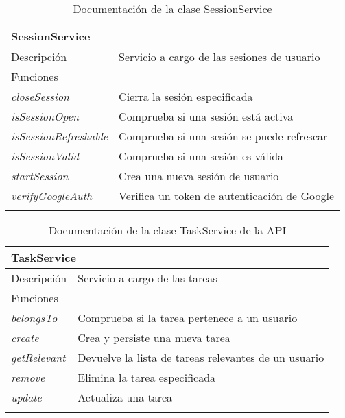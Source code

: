 \begin{longtable}{|p{} p{}|}
    \hline
    \multicolumn{2}{|l|}{\textbf{SessionService}} \\ \hline \hline
    Descripción      & Servicio a cargo de las sesiones de usuario \\ \hline
    \multicolumn{2}{|l|}{Funciones} \\
    \emph{closeSession}  & Cierra la sesión especificada  \\
    \emph{isSessionOpen}  & Comprueba si una sesión está activa  \\
    \emph{isSessionRefreshable}  & Comprueba si una sesión se puede refrescar  \\
    \emph{isSessionValid}  & Comprueba si una sesión es válida  \\
    \emph{startSession}  & Crea una nueva sesión de usuario  \\
    \emph{verifyGoogleAuth}  & Verifica un token de autenticación de Google  \\ \hline
    \caption{Documentación de la clase SessionService}
    \label{dis:api:session_service}
\end{longtable}

\vspace{-10pt}
\begin{longtable}{|p{} p{}|}
    \hline
    \multicolumn{2}{|l|}{\textbf{TaskService}} \\ \hline \hline
    Descripción      & Servicio a cargo de las tareas \\ \hline
    \multicolumn{2}{|l|}{Funciones} \\
    \emph{belongsTo}  & Comprueba si la tarea pertenece a un usuario  \\
    \emph{create}  & Crea y persiste una nueva tarea  \\
    \emph{getRelevant}  & Devuelve la lista de tareas relevantes de un usuario  \\
    \emph{remove}  & Elimina la tarea especificada  \\
    \emph{update}  & Actualiza una tarea  \\ \hline
    \caption{Documentación de la clase TaskService de la API}
    \label{dis:api:task_service}
\end{longtable}

